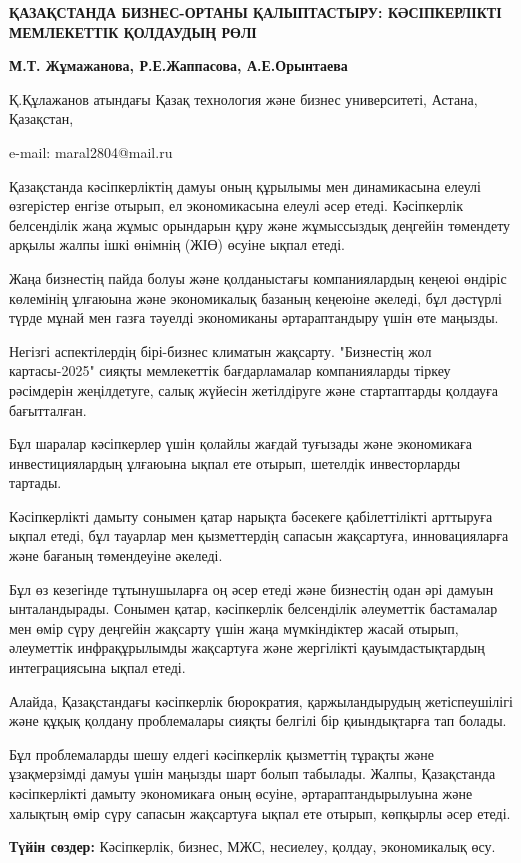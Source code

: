 {\bfseries ҚАЗАҚСТАНДА БИЗНЕС-ОРТАНЫ ҚАЛЫПТАСТЫРУ: КӘСІПКЕРЛІКТІ
МЕМЛЕКЕТТІК ҚОЛДАУДЫҢ РӨЛІ}

{\bfseries М.Т. Жұмажанова\textsuperscript{\envelope }, Р.Е.Жаппасова,
А.Е.Орынтаева}

Қ.Құлажанов атындағы Қазақ технология және бизнес университеті, Астана,
Қазақстан,

e-mail: maral2804@mail.ru

Қазақстанда кәсіпкерліктің дамуы оның құрылымы мен динамикасына елеулі
өзгерістер енгізе отырып, ел экономикасына елеулі әсер етеді.
Кәсіпкерлік белсенділік жаңа жұмыс орындарын құру және жұмыссыздық
деңгейін төмендету арқылы жалпы ішкі өнімнің (ЖІӨ) өсуіне ықпал етеді.

Жаңа бизнестің пайда болуы және қолданыстағы компаниялардың кеңеюі
өндіріс көлемінің ұлғаюына және экономикалық базаның кеңеюіне әкеледі,
бұл дәстүрлі түрде мұнай мен газға тәуелді экономиканы әртараптандыру
үшін өте маңызды.

Негізгі аспектілердің бірі-бизнес климатын жақсарту. "Бизнестің жол
картасы-2025" сияқты мемлекеттік бағдарламалар компанияларды тіркеу
рәсімдерін жеңілдетуге, салық жүйесін жетілдіруге және стартаптарды
қолдауға бағытталған.

Бұл шаралар кәсіпкерлер үшін қолайлы жағдай туғызады және экономикаға
инвестициялардың ұлғаюына ықпал ете отырып, шетелдік инвесторларды
тартады.

Кәсіпкерлікті дамыту сонымен қатар нарықта бәсекеге қабілеттілікті
арттыруға ықпал етеді, бұл тауарлар мен қызметтердің сапасын жақсартуға,
инновацияларға және бағаның төмендеуіне әкеледі.

Бұл өз кезегінде тұтынушыларға оң әсер етеді және бизнестің одан әрі
дамуын ынталандырады. Сонымен қатар, кәсіпкерлік белсенділік әлеуметтік
бастамалар мен өмір сүру деңгейін жақсарту үшін жаңа мүмкіндіктер жасай
отырып, әлеуметтік инфрақұрылымды жақсартуға және жергілікті
қауымдастықтардың интеграциясына ықпал етеді.

Алайда, Қазақстандағы кәсіпкерлік бюрократия, қаржыландырудың
жетіспеушілігі және құқық қолдану проблемалары сияқты белгілі бір
қиындықтарға тап болады.

Бұл проблемаларды шешу елдегі кәсіпкерлік қызметтің тұрақты және
ұзақмерзімді дамуы үшін маңызды шарт болып табылады. Жалпы, Қазақстанда
кәсіпкерлікті дамыту экономикаға оның өсуіне, әртараптандырылуына және
халықтың өмір сүру сапасын жақсартуға ықпал ете отырып, көпқырлы әсер
етеді.

{\bfseries Түйін сөздер:} Кәсіпкерлік, бизнес, МЖС, несиелеу, қолдау,
экономикалық өсу.

